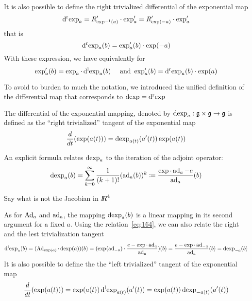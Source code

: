 It is also possible to define the right trivialized differential of the exponential map
\begin{equation}
  \label{eq:162}
  \operatorname{d^r exp}_a = R'_{\exp^{-1}(a)} \cdot \exp_a' = R'_{\exp(-a)} \cdot \exp_a' 
\end{equation}
that is
\begin{equation}
  \label{eq:163}
  \operatorname{d^r exp}_a(b) = \exp'_a(b) \cdot \exp(-a)
\end{equation}
With these expression, we have equivalently for 
\begin{equation}
  \label{eq:157}
   \exp_a'(b)  = \exp_a \cdot \operatorname{d^l exp}_a(b)\quad \text{ and } \exp_a'(b)  = \operatorname{d^r exp}_a(b) \cdot   \exp(a)
\end{equation}


To avoid to burden to much the notation, we introduced the unified definition of the differential map  that corresponds to $\operatorname{dexp}=\operatorname{d^r exp}$ 
\begin{definition}
The differential of the exponential mapping, denoted by $\operatorname{dexp}_a : \mathfrak g \times \mathfrak g \rightarrow \mathfrak g$ is defined as the ``right trivialized'' tangent of the exponential map
\begin{equation}
  \label{eq:42}
  \frac{d}{dt} (\exp(a(t))) = \operatorname{dexp}_{a(t)}(a'(t)) \exp(a(t))
\end{equation}
\end{definition}
An explicit formula relates $\operatorname{dexp}_{a}$ to the iteration of the adjoint operator:
\begin{equation}
  \label{eq:43}
  \operatorname{dexp}_a(b) = \sum_{k=0}^\infty \frac{1}{(k+1)!} (\operatorname{ad}_a(b))^k \coloneqq \frac{\exp\cdot\operatorname{ad}_a-e}{\operatorname{ad}_a}(b)
\end{equation}


\begin{ndrva}
  Say what is not the Jacobian in $\mbox{\rm $I\!\!R$}^4$
\end{ndrva}

As for $\operatorname{Ad}_a$ and $\operatorname{ad}_a$, the mapping $\operatorname{dexp}_{a}(b)$ is a linear mapping in its second argument for a fixed $a$. Using the relation~\eqref{eq:164}, we can also relate the right and the lest trivialization tangent
\begin{equation}
  \label{eq:165}
\operatorname{d^l exp}_a (b) =   (\operatorname{Ad}_{\exp(a)} \cdot \operatorname{dexp}(a))(b) = (\exp(\operatorname{ad}_{-a}) \cdot \frac{e - \exp\cdot\operatorname{ad}_a}{\operatorname{ad}_a})(b) = \frac{e - \exp\cdot\operatorname{ad}_{-a}}{\operatorname{ad}_a}(b) = \operatorname{dexp}_{-a}(b)
\end{equation}
It is also possible to define the  the ``left trivialized'' tangent of the exponential map
\begin{equation}
  \label{eq:46}
   \frac{d}{dt} (\exp(a(t))) =  \exp(a(t)) \operatorname{d^l exp}_{a(t)}(a'(t)) = \exp(a(t)) \operatorname{dexp}_{-a(t)}(a'(t)) 
\end{equation}

